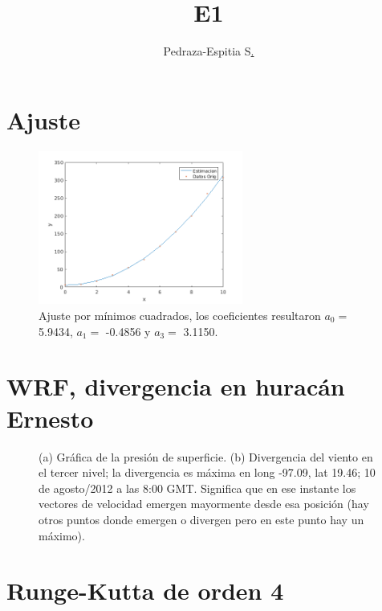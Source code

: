 \documentclass{article}
\title{E1}
\author{Pedraza-Espitia S\href{https://git.io/salvador}{.}}
\date{}
\begin{document}
\maketitle

\section{Ajuste}

\begin{figure}[!hbt]
\centering
  \includegraphics[width=0.6\textwidth]{E1_i4_ajuste}
	\caption{Ajuste por mínimos cuadrados, los coeficientes resultaron $a_0=$ 5.9434, $a_1=$ -0.4856 y $a_3=$ 3.1150.}%
	\label{fig:e1ajuste}
\end{figure}

\section{WRF, divergencia en  hurac\'an Ernesto}

\begin{figure}[!ht]
\centering
  \hfill{}\hfill
\caption{(a) Gr\'afica de la presión de superficie. (b) Divergencia del viento en el tercer nivel; la divergencia es  máxima en long \mbox{-97.09}, lat 19.46; 10 de agosto/2012 a las 8:00 GMT. Significa que en ese instante los vectores de velocidad emergen mayormente desde esa posición (hay otros puntos donde emergen o divergen pero en este punto hay un máximo).}%
\label{fig:netcdfdiver}
\end{figure}
\section{Runge-Kutta de orden 4}


\end{document}
